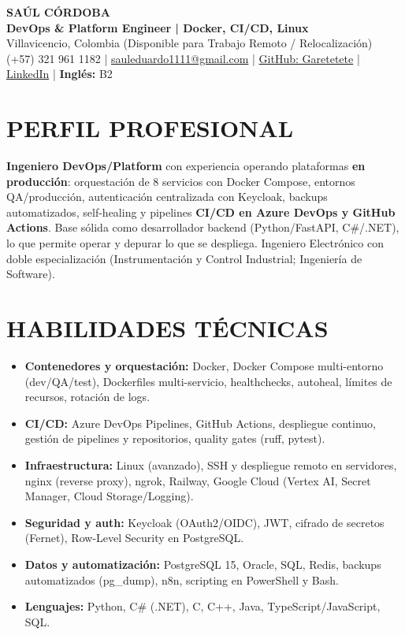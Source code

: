\documentclass[letterpaper,10pt]{article}
\begin{document}
\begin{center}
    {\Huge \bfseries SAÚL CÓRDOBA} \\[3pt]
    {\Large \textbf{DevOps \& Platform Engineer | Docker, CI/CD, Linux}} \\[2pt]
    Villavicencio, Colombia (Disponible para Trabajo Remoto / Relocalización) \\
    (+57) 321 961 1182 | \href{mailto:sauleduardo1111@gmail.com}{sauleduardo1111@gmail.com} | \href{https://github.com/Garetetete}{GitHub: Garetetete} | \href{https://www.linkedin.com/in/saul-cordoba-a2997427b}{LinkedIn} | \textbf{Inglés:} B2
\end{center}

\section{PERFIL PROFESIONAL}
\textbf{Ingeniero DevOps/Platform} con experiencia operando plataformas \textbf{en producción}: orquestación de 8 servicios con Docker Compose, entornos QA/producción, autenticación centralizada con Keycloak, backups automatizados, self-healing y pipelines \textbf{CI/CD en Azure DevOps y GitHub Actions}. Base sólida como desarrollador backend (Python/FastAPI, C\#/.NET), lo que permite operar y depurar lo que se despliega. Ingeniero Electrónico con doble especialización (Instrumentación y Control Industrial; Ingeniería de Software).

\section{HABILIDADES TÉCNICAS}
\begin{itemize}
    \item \textbf{Contenedores y orquestación:} Docker, Docker Compose multi-entorno (dev/QA/test), Dockerfiles multi-servicio, healthchecks, autoheal, límites de recursos, rotación de logs.
    \item \textbf{CI/CD:} Azure DevOps Pipelines, GitHub Actions, despliegue continuo, gestión de pipelines y repositorios, quality gates (ruff, pytest).
    \item \textbf{Infraestructura:} Linux (avanzado), SSH y despliegue remoto en servidores, nginx (reverse proxy), ngrok, Railway, Google Cloud (Vertex AI, Secret Manager, Cloud Storage/Logging).
    \item \textbf{Seguridad y auth:} Keycloak (OAuth2/OIDC), JWT, cifrado de secretos (Fernet), Row-Level Security en PostgreSQL.
    \item \textbf{Datos y automatización:} PostgreSQL 15, Oracle, SQL, Redis, backups automatizados (pg\_dump), n8n, scripting en PowerShell y Bash.
    \item \textbf{Lenguajes:} Python, C\# (.NET), C, C++, Java, TypeScript/JavaScript, SQL.
\end{itemize}
\end{document}
